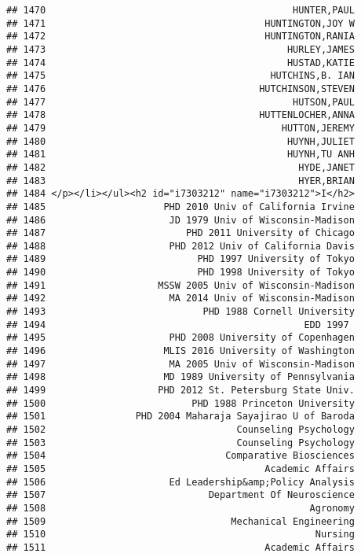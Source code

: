 \documentclass[
]{article}
\begin{document}
\begin{verbatim}
## 1470                                            HUNTER,PAUL
## 1471                                       HUNTINGTON,JOY W
## 1472                                       HUNTINGTON,RANIA
## 1473                                           HURLEY,JAMES
## 1474                                           HUSTAD,KATIE
## 1475                                        HUTCHINS,B. IAN
## 1476                                      HUTCHINSON,STEVEN
## 1477                                            HUTSON,PAUL
## 1478                                      HUTTENLOCHER,ANNA
## 1479                                          HUTTON,JEREMY
## 1480                                           HUYNH,JULIET
## 1481                                           HUYNH,TU ANH
## 1482                                             HYDE,JANET
## 1483                                             HYER,BRIAN
## 1484 </p></li></ul><h2 id="i7303212" name="i7303212">I</h2>
## 1485                     PHD 2010 Univ of California Irvine
## 1486                      JD 1979 Univ of Wisconsin-Madison
## 1487                         PHD 2011 University of Chicago
## 1488                      PHD 2012 Univ of California Davis
## 1489                           PHD 1997 University of Tokyo
## 1490                           PHD 1998 University of Tokyo
## 1491                    MSSW 2005 Univ of Wisconsin-Madison
## 1492                      MA 2014 Univ of Wisconsin-Madison
## 1493                            PHD 1988 Cornell University
## 1494                                              EDD 1997 
## 1495                      PHD 2008 University of Copenhagen
## 1496                     MLIS 2016 University of Washington
## 1497                      MA 2005 Univ of Wisconsin-Madison
## 1498                     MD 1989 University of Pennsylvania
## 1499                    PHD 2012 St. Petersburg State Univ.
## 1500                          PHD 1988 Princeton University
## 1501                PHD 2004 Maharaja Sayajirao U of Baroda
## 1502                                  Counseling Psychology
## 1503                                  Counseling Psychology
## 1504                                Comparative Biosciences
## 1505                                       Academic Affairs
## 1506                      Ed Leadership&amp;Policy Analysis
## 1507                             Department Of Neuroscience
## 1508                                               Agronomy
## 1509                                 Mechanical Engineering
## 1510                                                Nursing
## 1511                                       Academic Affairs

\end{verbatim}
\end{document}
